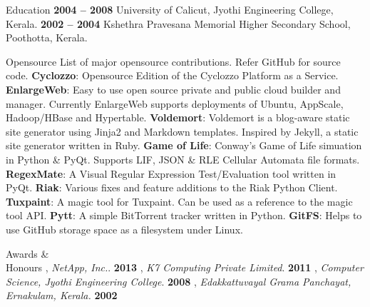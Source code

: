 \documentclass{resume}
\begin{document}

\begin{category}{Education}
   \hfill \textbf{2004 -- 2008}
  \citemnobullet University of Calicut, Jyothi Engineering College, Kerala.
   \hfill \textbf{2002 -- 2004}
  \citemnobullet Kshethra Pravesana Memorial Higher Secondary School, Poothotta, Kerala.
\end{category}


\begin{category}{Opensource}
  \citemnobullet List of major opensource contributions. Refer GitHub for source code.
  \citembullet \textbf{Cyclozzo}: Opensource Edition of the Cyclozzo Platform as a Service.
  \citembullet \textbf{EnlargeWeb}: Easy to use open source private and public cloud builder and manager. 
  Currently EnlargeWeb supports deployments of Ubuntu, AppScale, Hadoop/HBase and Hypertable.
  \citembullet \textbf{Voldemort}: Voldemort is a blog-aware static site generator using Jinja2 
  and Markdown templates. Inspired by Jekyll, a static site generator written in Ruby.
  \citembullet \textbf{Game of Life}: Conway's Game of Life simuation in Python \& PyQt. Supports LIF, JSON \&
  RLE Cellular Automata file formats.
  \citembullet \textbf{RegexMate}: A Visual Regular Expression Test/Evaluation tool written in PyQt.
  \citembullet \textbf{Riak}: Various fixes and feature additions to the Riak Python Client.
  \citembullet \textbf{Tuxpaint}: A magic tool for Tuxpaint. Can be used as a reference to the magic tool API.
  \citembullet \textbf{Pytt}: A simple BitTorrent tracker written in Python.
  \citembullet \textbf{GitFS}: Helps to use GitHub storage space as a filesystem under Linux.
\end{category}


\begin{category}{Awards \&\\ Honours}
  , {\em NetApp, Inc.}. \hfill \textbf{2013}
  , {\em K7 Computing Private Limited}. \hfill \textbf{2011}
  , {\em Computer Science, Jyothi Engineering College}. \hfill \textbf{2008}
  , {\em Edakkattuvayal Grama Panchayat, Ernakulam, Kerala.} \hfill \textbf{2002}
\end{category}
\end{document}
